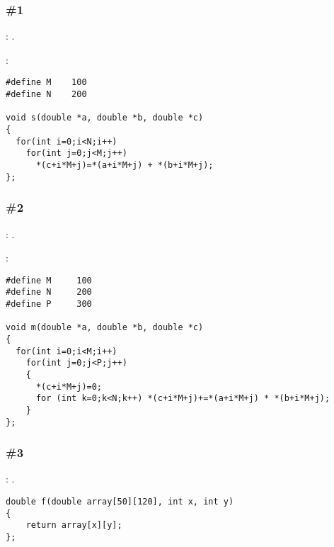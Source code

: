 \subsubsection{\Exercise \#1}
\label{exercise_solutions_arrays_1}

\Exercise: .


:

\begin{lstlisting}
#define M    100
#define N    200

void s(double *a, double *b, double *c)
{
  for(int i=0;i<N;i++)
    for(int j=0;j<M;j++)
      *(c+i*M+j)=*(a+i*M+j) + *(b+i*M+j);
};
\end{lstlisting}

\subsubsection{\Exercise \#2}
\label{exercise_solutions_arrays_2}

\Exercise: .


:

\begin{lstlisting}
#define M     100
#define N     200
#define P     300

void m(double *a, double *b, double *c)
{
  for(int i=0;i<M;i++)
    for(int j=0;j<P;j++)
    {
      *(c+i*M+j)=0;
      for (int k=0;k<N;k++) *(c+i*M+j)+=*(a+i*M+j) * *(b+i*M+j);
    }
};
\end{lstlisting}

\subsubsection{\Exercise \#3}
\label{exercise_solutions_arrays_3}

\Exercise: .

\begin{lstlisting}
double f(double array[50][120], int x, int y)
{
	return array[x][y];
};
\end{lstlisting}

